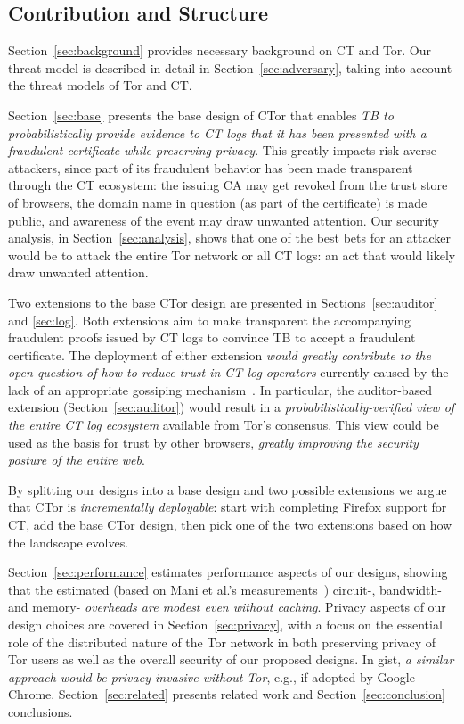 \subsection{Contribution and Structure}
Section~\ref{sec:background} provides necessary background on CT and Tor. Our
threat model is described in detail in Section~\ref{sec:adversary}, taking into
account the threat models of Tor and CT\@.

Section~\ref{sec:base} presents the base design of CTor that enables \emph{TB to
probabilistically provide evidence to CT logs that it has been presented with a
fraudulent certificate while preserving privacy}. This greatly impacts
risk-averse attackers, since part of its fraudulent behavior has been made
transparent through the CT ecosystem: the issuing CA may get revoked from the
trust store of browsers, the domain name in question (as part of the
certificate) is made public, and awareness of the event may draw unwanted
attention. Our security analysis, in Section~\ref{sec:analysis}, shows that one
of the best bets for an attacker would be to attack the entire Tor network or
all CT logs: an act that would likely draw unwanted attention.

Two extensions to the base CTor design are presented in
Sections~\ref{sec:auditor} and \ref{sec:log}. Both extensions aim to make
transparent the accompanying fraudulent proofs issued by CT logs to convince TB
to accept a fraudulent certificate. The deployment of either extension
\emph{would greatly contribute to the open question of how to reduce trust in CT
log operators} currently caused by the lack of an appropriate gossiping
mechanism~\cite{minimal-gossip,nordberg}. In particular, the auditor-based
extension (Section~\ref{sec:auditor}) would result in a
\emph{probabilistically-verified view of the entire CT log ecosystem} available
from Tor's consensus. This view could be used as the basis for trust by other
browsers, \emph{greatly improving the security posture of the entire web}.

By splitting our designs into a base design and two possible extensions we argue 
that CTor is \emph{incrementally deployable}: start with completing Firefox
support for CT, add the base CTor design, then pick one of the two extensions
based on how the landscape evolves.

Section~\ref{sec:performance} estimates performance aspects of our designs,
showing that the estimated (based on Mani et al.'s measurements~\cite{mani})
circuit-, bandwidth- and memory- \emph{overheads are modest even without
caching}. Privacy aspects of our design choices are covered in
Section~\ref{sec:privacy}, with a focus on the essential role of the distributed
nature of the Tor network in both preserving privacy of Tor users as well as the
overall security of our proposed designs. In gist, \emph{a similar approach
would be privacy-invasive without Tor}, e.g., if adopted by Google Chrome.
Section~\ref{sec:related} presents related work and Section~\ref{sec:conclusion}
conclusions.
